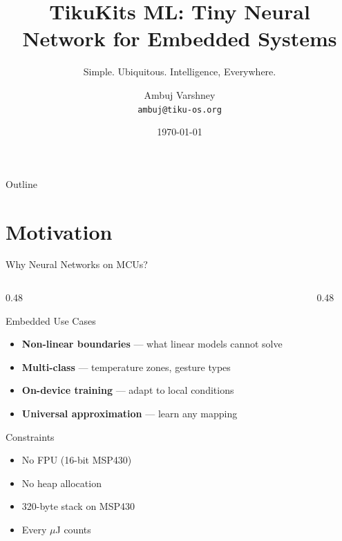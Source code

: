 \documentclass[aspectratio=169, 10pt]{beamer}
\title[TikuKits ML]{TikuKits ML: Tiny Neural Network for Embedded Systems}
\subtitle{Simple. Ubiquitous. Intelligence, Everywhere.}
\author[Ambuj Varshney]{Ambuj Varshney \\ \texttt{ambuj@tiku-os.org}}
\date{\today}
\begin{document}
\begin{frame}
\titlepage
\end{frame}

\begin{frame}{Outline}
\tableofcontents
\end{frame}

\section{Motivation}

\begin{frame}{Why Neural Networks on MCUs?}
\begin{columns}[T]
\begin{column}{0.48\textwidth}
\begin{block}{Embedded Use Cases}
\begin{itemize}
  \item \textbf{Non-linear boundaries} --- what linear models cannot solve
  \item \textbf{Multi-class} --- temperature zones, gesture types
  \item \textbf{On-device training} --- adapt to local conditions
  \item \textbf{Universal approximation} --- learn any mapping
\end{itemize}
\end{block}

\begin{block}{Constraints}
\begin{itemize}
  \item No FPU (16-bit MSP430)
  \item No heap allocation
  \item 320-byte stack on MSP430
  \item Every $\mu$J counts
\end{itemize}
\end{block}
\end{column}

\begin{column}{0.48\textwidth}
\begin{center}
\end{center}
\end{column}
\end{columns}
\end{frame}
\end{document}
